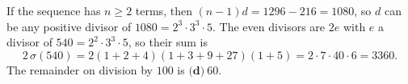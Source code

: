 If the sequence has $n\ge2$ terms, then $(n-1)d=1296-216=1080$, so $d$ can be any positive divisor of $1080=2^3\cdot3^3\cdot5$. The even divisors are $2e$ with $e$ a divisor of $540=2^2\cdot3^3\cdot5$, so their sum is
\[
2\,\sigma(540)=2(1+2+4)(1+3+9+27)(1+5)=2\cdot7\cdot40\cdot6=3360 .
\]
The remainder on division by $100$ is $\boxed{\textbf{(d)}\ 60}$.
